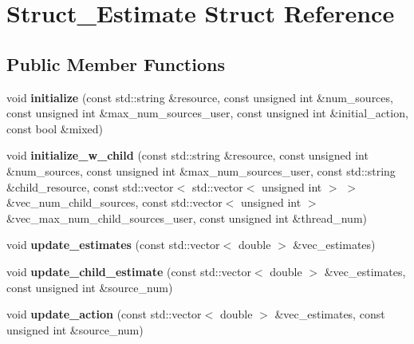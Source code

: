 \hypertarget{structStruct__Estimate}{\section{Struct\-\_\-\-Estimate Struct Reference}
\label{structStruct__Estimate}
}
\subsection*{Public Member Functions}
\begin{DoxyCompactItemize}
\item 
\hypertarget{structStruct__Estimate_a86b258312b0cbd9a988a8b8c80f72fb4}{void {\bfseries initialize} (const std\-::string \&resource, const unsigned int \&num\-\_\-sources, const unsigned int \&max\-\_\-num\-\_\-sources\-\_\-user, const unsigned int \&initial\-\_\-action, const bool \&mixed)}\label{structStruct__Estimate_a86b258312b0cbd9a988a8b8c80f72fb4}

\item 
\hypertarget{structStruct__Estimate_a14707ec3b60745fc143894f8b335e2eb}{void {\bfseries initialize\-\_\-w\-\_\-child} (const std\-::string \&resource, const unsigned int \&num\-\_\-sources, const unsigned int \&max\-\_\-num\-\_\-sources\-\_\-user, const std\-::string \&child\-\_\-resource, const std\-::vector$<$ std\-::vector$<$ unsigned int $>$ $>$ \&vec\-\_\-num\-\_\-child\-\_\-sources, const std\-::vector$<$ unsigned int $>$ \&vec\-\_\-max\-\_\-num\-\_\-child\-\_\-sources\-\_\-user, const unsigned int \&thread\-\_\-num)}\label{structStruct__Estimate_a14707ec3b60745fc143894f8b335e2eb}

\item 
\hypertarget{structStruct__Estimate_a1319536e0446f7017c1551375b7bd6bc}{void {\bfseries update\-\_\-estimates} (const std\-::vector$<$ double $>$ \&vec\-\_\-estimates)}\label{structStruct__Estimate_a1319536e0446f7017c1551375b7bd6bc}

\item 
\hypertarget{structStruct__Estimate_aafbf20ed9ca283b3d8e2da6a2d44a43e}{void {\bfseries update\-\_\-child\-\_\-estimate} (const std\-::vector$<$ double $>$ \&vec\-\_\-estimates, const unsigned int \&source\-\_\-num)}\label{structStruct__Estimate_aafbf20ed9ca283b3d8e2da6a2d44a43e}

\item 
\hypertarget{structStruct__Estimate_a304683373750daa1d4409658ab5e3164}{void {\bfseries update\-\_\-action} (const std\-::vector$<$ double $>$ \&vec\-\_\-estimates, const unsigned int \&source\-\_\-num)}\label{structStruct__Estimate_a304683373750daa1d4409658ab5e3164}

\end{DoxyCompactItemize}
